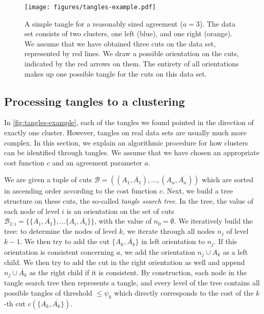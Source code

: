 \begin{figure}[h]
    \centering
    \texttt{[image: figures/tangles-example.pdf]}
    \caption{A simple tangle for a reasonably sized agreement ($a = 3$). 
        The data set consists of two clusters, one left (blue), and one right (orange).
        We assume that we have obtained three cuts on the data set, represented 
        by red lines.
        We draw a possible orientation on the cuts, indicated by the red arrows on them. 
        The entirety of all orientations makes up one possible tangle for the cuts 
        on this data set. 
    }
    \label{fig:tangles-example}
\end{figure}

\subsection{Processing tangles to a clustering}
In \autoref{fig:tangles-example}, each of the tangles we found pointed in the direction 
of exactly one cluster. However, tangles on real data sets
are usually much more complex. In this section, we explain an algorithmic procedure for how clusters 
can be identified through tangles. We assume that we have chosen an appropriate
cost function $c$ and an agreement parameter $a$. 

We are given a tuple of cuts $\mathcal{B} = \left(  \left( A_1, \overline{A_1} \right) , \ldots, 
\left( A_n, \overline{A_n} \right)\right) $ which are sorted in  
ascending order according to the cost function $c$.  Next, we build a tree structure
on these cuts, the so-called \textit{tangle search tree}. 
In the tree, the value of each node of level $i$ is an orientation on the set of cuts $\mathcal{B}_{1:i} = \{\{A_1, \overline{A_1}\}, \ldots \{A_i, \overline{A_i}\}\}$, with the value of 
$n_0 = \emptyset$.
We iteratively build the tree: to determine the nodes of level $k$, we 
iterate through all nodes $n_j$ of level $k-1$. 
We then try to add the cut $\{A_k, \overline{A_k}\}$ in left orientation to $n_j$. If this
orientation is consistent concerning $a$, we add the orientation $n_j \cup A_k$ as a left child. 
We then try to add the cut in the right orientation as well and append $n_j \cup \overline{A_k}$ as the right child if it is consistent.
By construction, each node in the tangle search tree then represents a tangle, and 
every level of the tree contains all possible tangles of threshold $\le \psi_k$ which directly corresponds to the cost of the $k$-th cut $c(\{A_k, \overline{A_k}\})$. 

